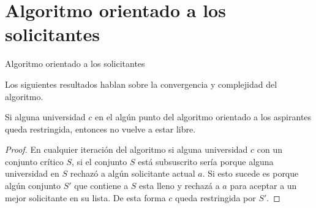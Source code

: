 \newpage

\section{Algoritmo orientado a los solicitantes}

\IncMargin{1em}
\begin{Algoritmo}[H]

\BlankLine
{}
\caption{Algoritmo orientado a los solicitantes}
\end{Algoritmo}
\DecMargin{1em}

Los siguientes resultados hablan sobre la convergencia y complejidad del algoritmo.

\begin{lem}
\label{lemaAOA1}
Si alguna universidad $c$ en el algún punto del algoritmo orientado a los aspirantes queda restringida, entonces no vuelve a estar libre.
\end{lem}
\begin{proof}
En cualquier iteración del algoritmo si alguna universidad $c$ con un conjunto crítico $S$, si el conjunto $S$ está subsuscrito sería porque alguna universidad en $S$ rechazó a algún solicitante actual $a$. Si esto sucede es porque algún conjunto $S'$
 que contiene a $S$ esta lleno y rechazá a $a$ para aceptar a un mejor solicitante en su lista. De esta forma $c$ queda restringida por $S'$.
\end{proof}


